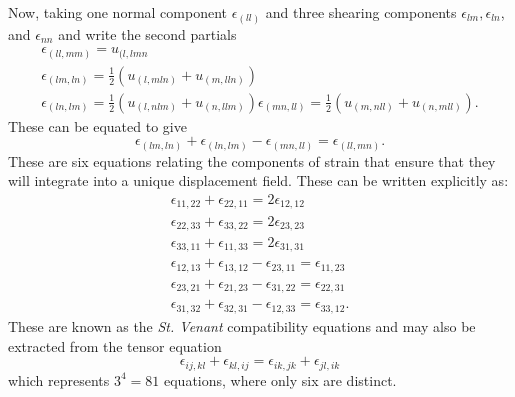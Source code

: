 Now, taking one normal component $\epsilon_{(l l)}$ and three shearing components $\epsilon_{lm}, \epsilon_{ln}$, and $\epsilon_{n n}$ and write the second partials
\begin{gather*}
  \epsilon_{(l l, mm)} = u_{(l,lmn} \\
  \epsilon_{(lm,l n)} = \frac{1}{2} \left( u_{(l,ml n)} + u_{(m,l l n )} \right) \\
  \epsilon_{(l n, lm)} = \frac{1}{2} \left( u_{(l, n lm)} + u_{(n,l l m)} \right)
  \epsilon_{(mn, l l)} = \frac{1}{2} \left( u_{(m, n l l)} + u_{(n, m l l)} \right)
.\end{gather*}
These can be equated to give
\begin{equation*}
  \epsilon_{(lm, l n)} + \epsilon_{(l n, lm)} - \epsilon_{(m n, l l)} = \epsilon_{(l l, mn)}
.\end{equation*}
These are six equations relating the components of strain that ensure that they will integrate into a unique displacement field.
These can be written explicitly as:
\begin{gather*}
  \epsilon_{11,22} + \epsilon_{22,11} = 2 \epsilon_{12,12} \\
  \epsilon_{22,33} + \epsilon_{33,22} = 2 \epsilon_{23,23} \\
  \epsilon_{33,11} + \epsilon_{11,33} = 2\epsilon_{31,31} \\
  \epsilon_{12,13} + \epsilon_{13,12} - \epsilon_{23,11} = \epsilon_{11,23} \\
  \epsilon_{23,21} + \epsilon_{21,23} - \epsilon_{31,22} = \epsilon_{22,31} \\
  \epsilon_{31,32} + \epsilon_{32,31} - \epsilon_{12,33} = \epsilon_{33,12}
.\end{gather*}
These are known as the \textit{St. Venant} compatibility equations and may also be extracted from the tensor equation
\begin{equation*}
  \epsilon_{ij,kl} + \epsilon_{kl,ij} = \epsilon_{ik,jk} + \epsilon_{jl,ik}
\end{equation*}
which represents $3^{4} = 81$ equations, where only six are distinct.
